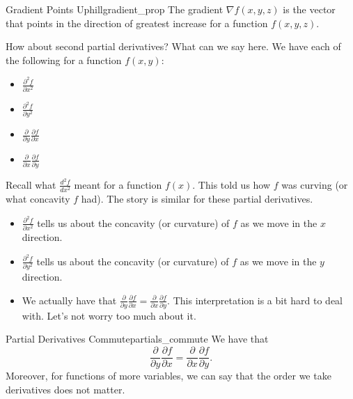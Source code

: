         \begin{prop}{Gradient Points Uphill}{gradient_prop}
        The gradient $\nabla f(x,y,z)$ is the vector that points in the direction of greatest increase for a function $f(x,y,z)$.
        \end{prop}
        
        How about second partial derivatives? What can we say here. We have each of the following for a function $f(x,y)$:
        \begin{itemize}
            \item $\frac{\partial^2 f}{\partial x^2}$
            \item $\frac{\partial^2 f}{\partial y^2}$
            \item $\frac{\partial}{\partial y}\frac{\partial f}{\partial x}$
            \item $\frac{\partial}{\partial x}\frac{\partial f}{\partial y}$
        \end{itemize}
        
        Recall what $\frac{d^2 f}{dx^2}$ meant for a function $f(x)$.  This told us how $f$ was curving (or what concavity $f$ had). The story is similar for these partial derivatives.
        
        \begin{itemize}
            \item $\frac{\partial^2 f}{\partial x^2}$ tells us about the concavity (or curvature) of $f$ as we move in the $x$ direction.
            \item $\frac{\partial^2 f}{\partial y^2}$ tells us about the concavity (or curvature) of $f$ as we move in the $y$ direction.
            \item We actually have that $\frac{\partial}{\partial y}\frac{\partial f}{\partial x}=\frac{\partial}{\partial x}\frac{\partial f}{\partial y}$.  This interpretation is a bit hard to deal with.  Let's not worry too much about it.
        \end{itemize}
        
        \begin{prop}{Partial Derivatives Commute}{partials_commute}
        We have that
        \[
        \frac{\partial}{\partial y}\frac{\partial f}{\partial x}=\frac{\partial}{\partial x}\frac{\partial f}{\partial y}.
        \]
        Moreover, for functions of more variables, we can say that the order we take derivatives does not matter.
        \end{prop}
        
